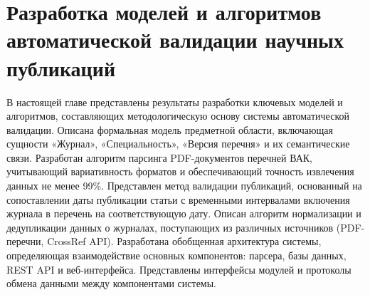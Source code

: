  \chapter{Разработка моделей и алгоритмов автоматической валидации научных публикаций}

 В настоящей главе представлены результаты разработки ключевых моделей и алгоритмов, составляющих методологическую основу системы автоматической валидации. Описана формальная модель предметной области, 
 включающая сущности «Журнал», «Специальность», «Версия перечня» и их семантические связи. 
 Разработан алгоритм парсинга PDF-документов перечней ВАК, учитывающий вариативность форматов и обеспечивающий точность 
 извлечения данных не менее 99\%. 
 Представлен метод валидации публикаций, основанный на сопоставлении даты публикации статьи с временными интервалами включения 
 журнала в перечень на соответствующую дату. Описан алгоритм нормализации и дедупликации данных о журналах, поступающих из 
 различных источников (PDF-перечни, CrossRef API). Разработана обобщенная архитектура системы, определяющая взаимодействие 
 основных компонентов: парсера, базы данных, REST API и веб-интерфейса. Представлены интерфейсы модулей и протоколы обмена 
 данными между компонентами системы.
